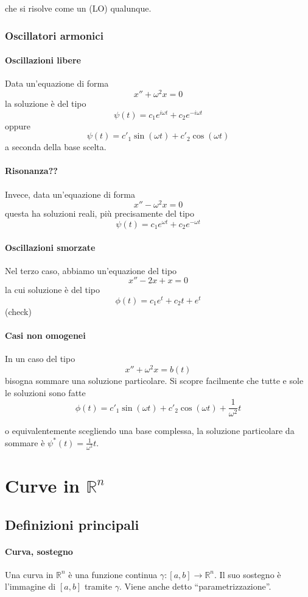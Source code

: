 \documentclass[a4paper,12pt]{article}
\begin{document}
che si risolve come un (LO) qualunque.

\subsubsection{Oscillatori armonici}
\paragraph{Oscillazioni libere}
Data un'equazione di forma
$$x''+\omega^2 x=0$$
la soluzione è del tipo
$$\psi(t) = c_1 e^{i\omega t} + c_2 e^{-i\omega t}$$
oppure
$$\psi(t) = c'_1\sin(\omega t) + c'_2\cos(\omega t)$$
a seconda della base scelta.

\paragraph{Risonanza??}
Invece, data un'equazione di forma
$$x''-\omega^2 x=0$$
questa ha soluzioni reali, più precisamente del tipo
$$\psi(t) = c_1 e^{\omega t} + c_2 e^{-\omega t}$$

\paragraph{Oscillazioni smorzate}
Nel terzo caso, abbiamo un'equazione del tipo
$$x''-2x +x=0$$
la cui soluzione è del tipo
$$\phi(t) = c_1e^t +c_2 t + e^t$$
(check)

\paragraph{Casi non omogenei}
In un caso del tipo
$$x''+\omega^2 x=b(t)$$
bisogna sommare una soluzione particolare. Si scopre facilmente che tutte e sole le soluzioni sono fatte
$$\phi(t) = c'_1\sin(\omega t) + c'_2\cos(\omega t) + \frac{1}{\omega^2}t$$

o equivalentemente scegliendo una base complessa, la soluzione particolare da sommare è $\psi^*(t) = \frac{1}{\omega^2}t$.

\section{Curve in $\mathbb{R}^n$}
\subsection{Definizioni principali}
\paragraph{Curva, sostegno}
Una curva in $\mathbb{R}^n$ è una funzione continua $\gamma:[a,b]\rightarrow\mathbb{R}^n$.
Il suo sostegno è l'immagine di $[a,b]$ tramite $\gamma$. Viene anche detto ``parametrizzazione''.
\end{document}
